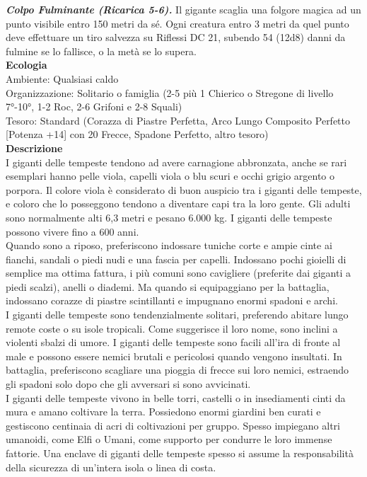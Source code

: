 \begin{multicols}{2}
\emph{\textbf{Colpo Fulminante (Ricarica 5-6).}} Il gigante scaglia una folgore magica ad un punto visibile entro 150 metri da sé. Ogni creatura entro 3 metri da quel punto deve effettuare un tiro salvezza su Riflessi DC  21, subendo 54 (12d8) danni da fulmine se lo fallisce, o la metà se lo supera.\\
\textbf{Ecologia}\\
Ambiente: Qualsiasi caldo\\
Organizzazione: Solitario o famiglia (2-5 più 1 Chierico o Stregone di livello 7°-10°, 1-2 Roc, 2-6 Grifoni e 2-8 Squali)\\
Tesoro: Standard (Corazza di Piastre Perfetta, Arco Lungo Composito Perfetto [Potenza +14] con 20 Frecce, Spadone Perfetto, altro tesoro)\\
\textbf{Descrizione}\\
I giganti delle tempeste tendono ad avere carnagione abbronzata, anche se rari esemplari hanno pelle viola, capelli viola o blu scuri e occhi grigio argento o porpora. Il colore viola è considerato di buon auspicio tra i giganti delle tempeste, e coloro che lo posseggono tendono a diventare capi tra la loro gente. Gli adulti sono normalmente alti 6,3 metri e pesano 6.000 kg. I giganti delle tempeste possono vivere fino a 600 anni.\\

Quando sono a riposo, preferiscono indossare tuniche corte e ampie cinte ai fianchi, sandali o piedi nudi e una fascia per capelli. Indossano pochi gioielli di semplice ma ottima fattura, i più comuni sono cavigliere (preferite dai giganti a piedi scalzi), anelli o diademi. Ma quando si equipaggiano per la battaglia, indossano corazze di piastre scintillanti e impugnano enormi spadoni e archi.\\

I giganti delle tempeste sono tendenzialmente solitari, preferendo abitare lungo remote coste o su isole tropicali. Come suggerisce il loro nome, sono inclini a violenti sbalzi di umore. I giganti delle tempeste sono facili all’ira di fronte al male e possono essere nemici brutali e pericolosi quando vengono insultati. In battaglia, preferiscono scagliare una pioggia di frecce sui loro nemici, estraendo gli spadoni solo dopo che gli avversari si sono avvicinati.\\

I giganti delle tempeste vivono in belle torri, castelli o in insediamenti cinti da mura e amano coltivare la terra. Possiedono enormi giardini ben curati e gestiscono centinaia di acri di coltivazioni per gruppo. Spesso impiegano altri umanoidi, come Elfi o Umani, come supporto per condurre le loro immense fattorie. Una enclave di giganti delle tempeste spesso si assume la responsabilità della sicurezza di un’intera isola o linea di costa.\\


\end{multicols}
